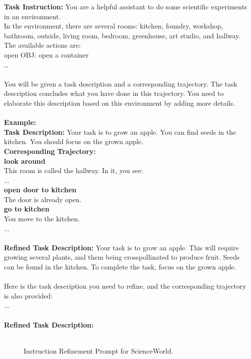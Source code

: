 \begin{tcolorbox}[breakable,title=Instruction Refinement Prompt for ScienceWorld]
\textcolor{my_blue!50}{\textbf{Task Instruction:} You are a helpful assistant to do some scientific experiments in an environment. \\
In the environment, there are several rooms: kitchen, foundry, workshop, bathroom, outside, living room, bedroom, greenhouse, art studio, and hallway. \\
The available actions are: \\
open OBJ: open a container \\
… \\
\\
You will be given a task description and a corresponding trajectory. The task description concludes what you have done in this trajectory. You need to elaborate this description based on this environment by adding more details. \\
}\\

\textcolor{my_green!50}{\textbf{Example:} }\\
\textcolor{my_purple}{
\textbf{Task Description:} Your task is to grow an apple. You can find seeds in the kitchen. You should focus on the grown apple. \\
\textbf{Corresponding Trajectory:} \\
\textbf{look around} \\
This room is called the hallway. In it, you see: \\
...\\
\textbf{open door to kitchen}\\
The door is already open.\\
\textbf{go to kitchen}\\
You move to the kitchen.\\
...\\
\\
\textbf{Refined Task Description:} Your task is to grow an apple. This will require growing several plants, and them being crosspollinated to produce fruit. Seeds can be found in the kitchen. To complete the task, focus on the grown apple.
}\\
\\
\textcolor{my_blue!50}{Here is the task description you need to refine, and the corresponding trajectory is also provided:\\
...\\
\\
\textbf{Refined Task Description:} \\
}\\
\end{tcolorbox}
\begin{figure}[!htp]
    \centering
    \vspace{-8pt}
    \caption{
    Instruction Refinement Prompt for ScienceWorld.
    }
    \label{fig:instruction_refinement_sciworld}
\end{figure}

